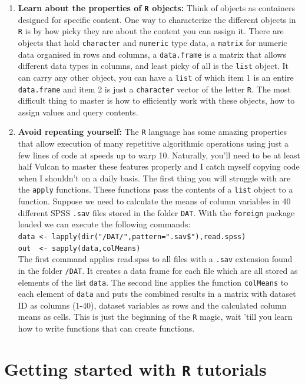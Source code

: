 \documentclass[12pt,]{book}
\let\stdsection\section
\renewcommand\section{\newpage\stdsection}
\begin{document}
\begin{enumerate}
\item
  \textbf{Learn about the properties of \texttt{R} objects:} Think of objects as containers designed for specific content. One way to characterize the different objects in \texttt{R} is by how picky they are about the content you can assign it. There are objects that hold \texttt{character} and \texttt{numeric} type data, a \texttt{matrix} for numeric data organised in rows and columns, a \texttt{data.frame} is a matrix that allows different data types in columns, and least picky of all is the \texttt{list} object. It can carry any other object, you can have a \texttt{list} of which item 1 is an entire \texttt{data.frame} and item 2 is just a \texttt{character} vector of the letter \texttt{R}. The most difficult thing to master is how to efficiently work with these objects, how to assign values and query contents.
\item
  \textbf{Avoid repeating yourself:} The \texttt{R} language has some amazing properties that allow execution of many repetitive algorithmic operations using just a few lines of code at speeds up to warp 10. Naturally, you'll need to be at least half Vulcan to master these features properly and I catch myself copying code when I shouldn't on a daily basis. The first thing you will struggle with are the \texttt{apply} functions. These functions pass the contents of a \texttt{list} object to a function. Suppose we need to calculate the means of column variables in 40 different SPSS \texttt{.sav} files stored in the folder \texttt{DAT}. With the \texttt{foreign} package loaded we can execute the following commands:\\
  \texttt{data\ \textless{}-\ lapply(dir("/DAT/",pattern=".sav\$"),read.spss)}~\\
  \texttt{out\ \ \textless{}-\ sapply(data,colMeans)}~\\
  The first command applies read.spss to all files with a \texttt{.sav} extension found in the folder \texttt{/DAT}. It creates a data frame for each file which are all stored as elements of the list \texttt{data}. The second line applies the function \texttt{colMeans} to each element of \texttt{data} and puts the combined results in a matrix with dataset ID as columns (1-40), dataset variables as rows and the calculated column means as cells. This is just the beginning of the \texttt{R} magic, wait 'till you learn how to write functions that can create functions.
\end{enumerate}

\hypertarget{tutorials}{%
\section*{\texorpdfstring{\textbf{Getting started with \texttt{R} tutorials}}{Getting started with R tutorials}}\label{tutorials}}
\end{document}
